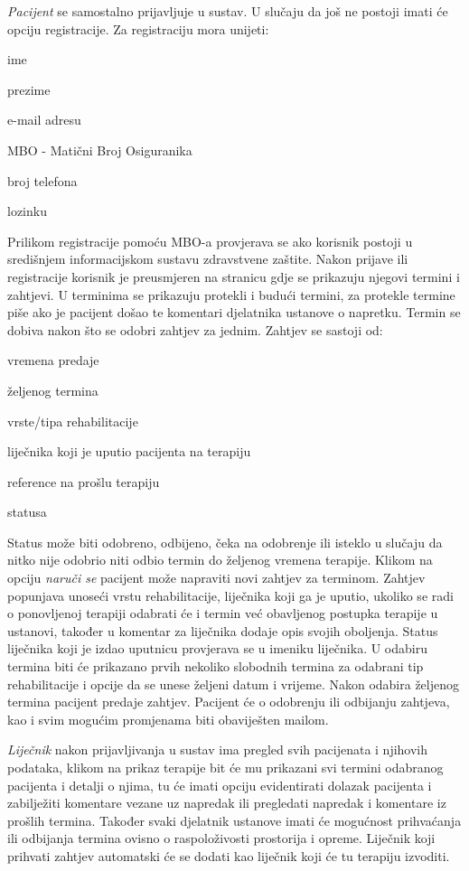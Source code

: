 		\textit{Pacijent} se samostalno prijavljuje u sustav. U slučaju da još ne postoji imati će opciju registracije. Za registraciju mora unijeti: 
		\begin{packed_item}
			\item ime
			\item prezime
			\item e-mail adresu
			\item MBO - Matični Broj Osiguranika
			\item broj telefona
			\item lozinku
		\end{packed_item}
		Prilikom registracije pomoću MBO-a provjerava se ako korisnik postoji u središnjem informacijskom sustavu zdravstvene zaštite.
		Nakon prijave ili registracije korisnik je preusmjeren na stranicu gdje se prikazuju njegovi termini i zahtjevi. U terminima se prikazuju protekli i budući termini, za protekle termine piše ako je pacijent došao te komentari djelatnika ustanove o napretku. Termin se dobiva nakon što se odobri zahtjev za jednim.		
		Zahtjev se sastoji od:
		\begin{packed_item}
			\item vremena predaje
			\item željenog termina
			\item vrste/tipa rehabilitacije
			\item liječnika koji je uputio pacijenta na terapiju
			\item reference na prošlu terapiju
			\item statusa
		\end{packed_item}
		Status može biti odobreno, odbijeno, čeka na odobrenje ili isteklo u slučaju da nitko nije odobrio niti odbio termin do željenog vremena terapije.
		Klikom na opciju \textit{naruči se} pacijent može napraviti novi zahtjev za terminom. Zahtjev popunjava unoseći vrstu rehabilitacije, liječnika koji ga je uputio, ukoliko se radi o ponovljenoj terapiji odabrati će i termin već obavljenog postupka terapije u ustanovi, također u komentar za liječnika dodaje opis svojih oboljenja. Status liječnika koji je izdao uputnicu provjerava se u imeniku liječnika. U odabiru termina biti će prikazano prvih nekoliko slobodnih termina za odabrani tip rehabilitacije i opcije da se unese željeni datum i vrijeme. Nakon odabira željenog termina pacijent predaje zahtjev. Pacijent će o odobrenju ili odbijanju zahtjeva, kao i svim mogućim promjenama biti obaviješten mailom.
		
		\textit{Liječnik} nakon prijavljivanja u sustav ima pregled svih pacijenata i njihovih podataka, klikom na prikaz terapije bit će mu prikazani svi termini odabranog pacijenta i detalji o njima, tu će imati opciju evidentirati dolazak pacijenta i zabilježiti komentare vezane uz napredak ili pregledati napredak i komentare iz prošlih termina. Također svaki djelatnik ustanove imati će mogućnost prihvaćanja ili odbijanja termina ovisno o raspoloživosti prostorija i opreme. Liječnik koji prihvati zahtjev automatski će se dodati kao liječnik koji će tu terapiju izvoditi. 
		

